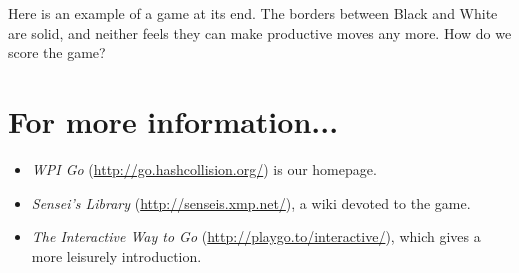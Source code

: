 \documentclass{article}
\begin{document}
Here is an example of a game at its end.
The borders between Black and White are solid, and neither feels they
can make productive moves any more.  How do we score the game?
\begin{itemize}
\end{itemize}




\section*{For more information...}
\begin{itemize}
\item \emph{WPI Go} (\url{http://go.hashcollision.org/}) is our homepage.

\item \emph{Sensei's Library} (\url{http://senseis.xmp.net/}), a wiki
  devoted to the game.

\item \emph{The Interactive Way to Go}
  (\url{http://playgo.to/interactive/}), which gives a more leisurely
  introduction.
\end{itemize}
\end{document}
